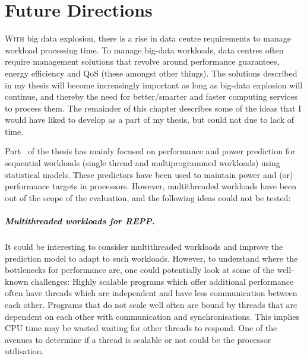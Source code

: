 \chapter{Future Directions} 
\label{chap: futurework}



 \lettrine{W}{ith} big data explosion, there is a rise in data centre
requirements to manage workload processing time. To manage big-data workloads, data
centres often require management solutions that revolve around performance guarantees,
energy efficiency and QoS (these amongst other things). The solutions described in my
thesis will become increasingly important as long as big-data explosion will continue, and
thereby the need for better/smarter and faster computing services to process them.  The
remainder of this chapter describes some of the ideas that I would have liked to develop
as a part of my thesis, but could not due to lack of time.

 Part~ of the thesis has mainly focused on performance and power
prediction for sequential workloads (single thread and multiprogrammed workloads) using
statistical models.  These predictors have been used to maintain power and (or)
performance targets in \muc processors.  However, multithreaded workloads have been out of
the scope of the evaluation, and the following ideas could not be tested: 


 \paragraph{Multithreaded workloads for REPP.} It could be interesting to
consider multithreaded workloads and improve the prediction model to adapt to such
workloads. However, to understand where the bottlenecks for performance are, one could
potentially look at some of the well-known challenges: {\small{}} Highly scalable
programs which offer additional performance often have threads which are independent and
have less communication between each other.  {\small{}} Programs that do not
scale well often are bound by threads that are dependent on each other with communication
and synchronisations. This implies CPU time may be wasted waiting for other threads to
respond. One of the avenues to determine if a thread is scalable or not could be the
processor utilisation. 

